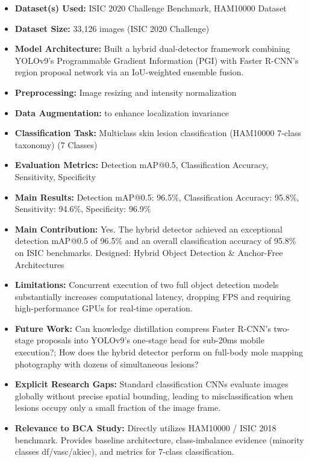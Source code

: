 \documentclass[11pt,a4paper]{article}
\begin{document}
\begin{itemize}\small
\item \textbf{Dataset(s) Used:} ISIC 2020 Challenge Benchmark, HAM10000 Dataset
\item \textbf{Dataset Size:} 33,126 images (ISIC 2020 Challenge)
\item \textbf{Model Architecture:} Built a hybrid dual-detector framework combining YOLOv9's Programmable Gradient Information (PGI) with Faster R-CNN's region proposal network via an IoU-weighted ensemble fusion.
\item \textbf{Preprocessing:} Image resizing and intensity normalization
\item \textbf{Data Augmentation:} to enhance localization invariance
\item \textbf{Classification Task:} Multiclass skin lesion classification (HAM10000 7-class taxonomy) (7 Classes)
\item \textbf{Evaluation Metrics:} Detection mAP@0.5, Classification Accuracy, Sensitivity, Specificity
\item \textbf{Main Results:} Detection mAP@0.5: 96.5\%, Classification Accuracy: 95.8\%, Sensitivity: 94.6\%, Specificity: 96.9\%
\item \textbf{Main Contribution:} Yes. The hybrid detector achieved an exceptional detection mAP@0.5 of 96.5\% and an overall classification accuracy of 95.8\% on ISIC benchmarks. Designed: Hybrid Object Detection \& Anchor-Free Architectures
\item \textbf{Limitations:} Concurrent execution of two full object detection models substantially increases computational latency, dropping FPS and requiring high-performance GPUs for real-time operation.
\item \textbf{Future Work:} Can knowledge distillation compress Faster R-CNN's two-stage proposals into YOLOv9's one-stage head for sub-20ms mobile execution?; How does the hybrid detector perform on full-body mole mapping photography with dozens of simultaneous lesions?
\item \textbf{Explicit Research Gaps:} Standard classification CNNs evaluate images globally without precise spatial bounding, leading to misclassification when lesions occupy only a small fraction of the image frame.
\item \textbf{Relevance to BCA Study:} Directly utilizes HAM10000 / ISIC 2018 benchmark. Provides baseline architecture, class-imbalance evidence (minority classes df/vasc/akiec), and metrics for 7-class classification.
\end{itemize}
\end{document}

